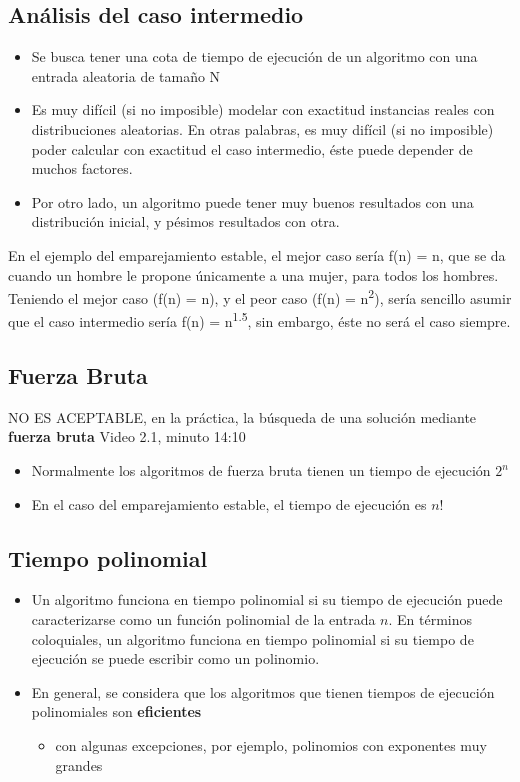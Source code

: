 \documentclass[letterpaper]{article}
\begin{document}
\subsection{Análisis del caso intermedio}
\label{sec:org81fe439}
\begin{itemize}
\item Se busca tener una cota de tiempo de ejecución de un algoritmo con una entrada
aleatoria de tamaño N
\item Es muy difícil (si no imposible) modelar con exactitud instancias reales con
distribuciones aleatorias. En otras palabras, es muy difícil (si no imposible)
poder calcular con exactitud el caso intermedio, éste puede depender de muchos
factores.
\item Por otro lado, un algoritmo puede tener muy buenos resultados con una
distribución inicial, y pésimos resultados con otra.
\end{itemize}

En el ejemplo del emparejamiento estable, el mejor caso sería f(n) = n, que se
da cuando un hombre le propone únicamente a una mujer, para todos los hombres.
Teniendo el mejor caso (f(n) = n), y el peor caso (f(n) = n\textsuperscript{2}), sería sencillo
asumir que el caso intermedio sería f(n) = n\textsuperscript{1.5}, sin embargo, éste no será el
caso siempre.
\subsection{Fuerza Bruta}
\label{sec:org388ae50}
NO ES ACEPTABLE, en la práctica, la búsqueda de una solución mediante \textbf{fuerza
bruta}
Video 2.1, minuto 14:10
\begin{itemize}
\item Normalmente los algoritmos de fuerza bruta tienen un tiempo de ejecución \(2^n\)
\item En el caso del emparejamiento estable, el tiempo de ejecución es \(n!\)
\end{itemize}
\subsection{Tiempo polinomial}
\label{sec:org96eb1a4}
\begin{itemize}
\item Un algoritmo funciona en tiempo polinomial si su tiempo de ejecución puede
caracterizarse como un función polinomial de la entrada \(n\). En términos
coloquiales, un algoritmo funciona en tiempo polinomial si su tiempo de
ejecución se puede escribir como un polinomio.
\item En general, se considera que los algoritmos que tienen tiempos de ejecución
polinomiales son \textbf{eficientes}
\begin{itemize}
\item con algunas excepciones, por ejemplo, polinomios con exponentes muy grandes
\end{itemize}
\end{itemize}
\end{document}
